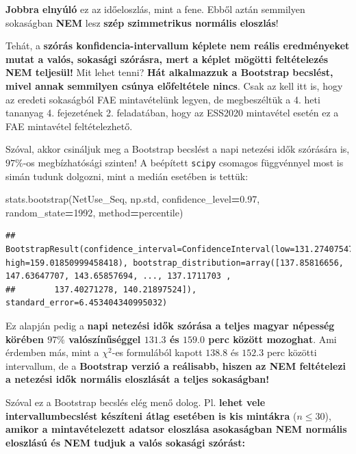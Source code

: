 \documentclass[
]{book}
\newenvironment{Shaded}{\begin{snugshade}}{\end{snugshade}}
\newcommand{\DecValTok}[1]{\textcolor[rgb]{0.00,0.00,0.81}{#1}}
\newcommand{\FloatTok}[1]{\textcolor[rgb]{0.00,0.00,0.81}{#1}}
\newcommand{\NormalTok}[1]{#1}
\newcommand{\OperatorTok}[1]{\textcolor[rgb]{0.81,0.36,0.00}{\textbf{#1}}}
\newcommand{\StringTok}[1]{\textcolor[rgb]{0.31,0.60,0.02}{#1}}
\begin{document}
\textbf{Jobbra elnyúló} ez az időeloszlás, mint a fene. Ebből aztán semmilyen sokaságban \textbf{NEM} lesz \textbf{szép szimmetrikus normális eloszlás}!

Tehát, a \textbf{szórás konfidencia-intervallum képlete nem reális eredményeket mutat a valós, sokasági szórásra, mert a képlet mögötti feltételezés NEM teljesül!}
Mit lehet tenni? \textbf{Hát alkalmazzuk a Bootstrap becslést, mivel annak semmilyen csúnya előfeltétele nincs}. Csak az kell itt is, hogy az eredeti sokaságból FAE mintavételünk legyen, de megbeszéltük a 4. heti tananyag 4. fejezetének 2. feladatában, hogy az ESS2020 mintavétel esetén ez a FAE mintavétel feltételezhető.

Szóval, akkor csináljuk meg a Bootstrap becslést a napi netezési idők szórására is, \(97\%\)-os megbízhatósági szinten! A beépített \texttt{scipy} csomagos függvénnyel most is simán tudunk dolgozni, mint a medián esetében is tettük:

\begin{Shaded}
\begin{Highlighting}[]
\NormalTok{stats.bootstrap(NetUse\_Seq, np.std, confidence\_level}\OperatorTok{=}\FloatTok{0.97}\NormalTok{,}
\NormalTok{                         random\_state}\OperatorTok{=}\DecValTok{1992}\NormalTok{, method}\OperatorTok{=}\StringTok{\textquotesingle{}percentile\textquotesingle{}}\NormalTok{)}
\end{Highlighting}
\end{Shaded}

\begin{verbatim}
## BootstrapResult(confidence_interval=ConfidenceInterval(low=131.27407547315042, high=159.01850999458418), bootstrap_distribution=array([137.85816656, 147.63647707, 143.65857694, ..., 137.1711703 ,
##        137.40271278, 140.21897524]), standard_error=6.453404340995032)
\end{verbatim}

Ez alapján pedig a \textbf{napi netezési idők szórása a teljes magyar népesség körében \(97\%\) valószínűséggel \(131.3\) és \(159.0\) perc között mozoghat}. Ami érdemben más, mint a \(\chi^2\)-es formulából kapott \(138.8\) és \(152.3\) perc közötti intervallum, de a \textbf{Bootstrap verzió a reálisabb, hiszen az NEM feltételezi a netezési idők normális eloszlását a teljes sokaságban!}

Szóval ez a Bootstrap becslés elég menő dolog. Pl. \textbf{lehet vele intervallumbecslést készíteni átlag esetében is kis mintákra} (\(n\leq 30\)), \textbf{amikor a mintavételezett adatsor eloszlása asokaságban NEM normális eloszlású és NEM tudjuk a valós sokasági szórást:}
\end{document}
